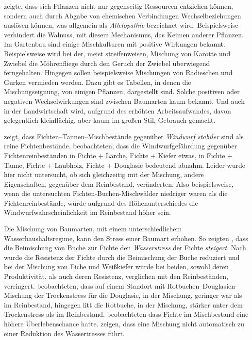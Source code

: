 \documentclass[twocolumn]{scrartcl}
\begin{document}
\cite{molisch1937allelopathie} zeigte, dass sich Pflanzen nicht nur
gegenseitig Ressourcen entziehen können, sondern auch durch Abgabe von
chemischen Verbindungen Wechselbeziehungen auslösen können, was
allgemein als \emph{Allelopathie} bezeichnet wird. Beispielsweise
verhindert die Walnuss, mit diesem Mechanismus, das Keimen anderer
Pflanzen. Im Gartenbau sind einige Mischkulturen mit positive
Wirkungen bekannt. Beispielsweise wird bei der, meist streifenweisen,
Mischung von Karotte und Zwiebel die Möhrenfliege durch den Geruch der
Zwiebel überwiegend ferngehalten. Hingegen sollen beispielsweise
Mischungen von Radieschen und Gurken vermieden werden. Dazu gibt es
Tabellen, in denen die Mischungseignung, von einigen Pflanzen,
dargestellt sind. Solche positiven oder negativen Wechselwirkungen
sind zwischen Baumarten kaum bekannt. Und auch in der Landwirtschaft
wird, aufgrund des erhöhten Arbeitsaufwandes, davon gelegentlich
kleinflächig, aber kaum im großen Stil, Gebrauch gemacht.

\cite{schmidtVogt1987Sturmstabilitaet} zeigt, dass
Fichten--Tannen--Mischbestände gegenüber \emph{Windwurf stabiler} sind
als reine Fichtenbestände. \cite{schuetz2006stabilitaetMischbestand}
beobachteten, dass die Windwurfgefährdung gegenüber
Fichtenreinbeständen in Fichte + Lärche, Fichte + Kiefer etwas, in
Fichte + Tanne, Fichte + Laubholz, Fichte + Douglasie bedeutend
abnahm. Leider wurde hier nicht untersucht, ob sich gleichzeitig mit
der Mischung, andere Eigenschaften, gegenüber dem Reinbestand,
veränderten. Also beispielsweise, wenn die untersuchten
Fichten-Buchen-Mischwälder niedriger waren als die
Fichtenreinbestände, würde aufgrund des Höhenunterschiedes die
Windwurfwahrscheinlichkeit im Reinbestand höher sein.

Die Mischung von Baumarten, mit einem unterschiedlichem
Wasserhaushaltsregime, kann den Stress einer Baumart erhöhen. So
zeigten \cite{schume2004wasserFichteBuche}, dass die Beimischung von
Buche zur Fichte den \emph{Wasserstress} der Fichte
\emph{steigert}. Nach \cite{nothdurft2020mischbestand} wurde die
Resistenz der Fichte durch die Beimischung der Buche reduziert und bei
der Mischung von Eiche und Weißkiefer wurde bei beiden, sowohl deren
Produktivität, als auch deren Resistenz, verglichen mit den
Reinbeständen, verringert. \cite{thurm2016mischungDougBuStress}
beobachteten, dass auf einem Standort mit
Rotbuchen--Douglasien--Mischung der Trockenstress für die Douglasie,
in der Mischung, geringer war als im Reinbestand, hingegen litt die
Rotbuche, in der Mischung, stärker unter dem Trockenstress als im
Reinbestand. \cite{neuner2015FichteAusfall} beobachteten dass Fichte
im Mischbestand eine höhere Überlebenschance
hatte. \cite{schnabel2022mischwaldTrockenstress} zeigen, dass eine
Mischung nicht automatisch zu einer Reduktion des Wassertresses führt.
\end{document}
